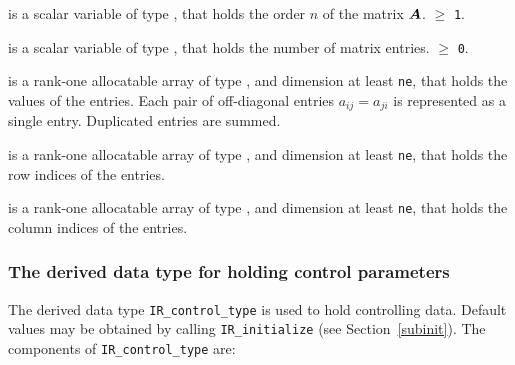 \documentclass{galahad}
\newcommand{\packagename}{IR}
\begin{document}
\begin{description}

 is a scalar variable of type \integer, that holds
the order $n$ of the matrix  ${\bm{A}}$.
 $\geq$ {\tt 1}.

 is a scalar variable of type \integer, that holds the
number of matrix entries.
 $\geq$ {\tt 0}.

 is a rank-one allocatable array of type \realdp,
and dimension at least {\tt ne}, that holds the values of the entries.
Each pair of off-diagonal entries $a_{ij} = a_{ji} $
is represented as a single entry. Duplicated entries are summed.

 is a rank-one allocatable array of type \integer,
and dimension at least {\tt ne}, that holds the row indices of the entries.

 is a rank-one allocatable array of type \integer,
and dimension at least {\tt ne}, that holds the column indices of the entries.

\end{description}


\subsubsection{The derived data type for holding control
 parameters}\label{typecontrol}
The derived data type
{\tt \packagename\_control\_type}
is used to hold controlling data. Default values may be obtained by calling
{\tt \packagename\_initialize}
(see Section~\ref{subinit}). The components of
{\tt \packagename\_control\_type}
are:
\end{document}
